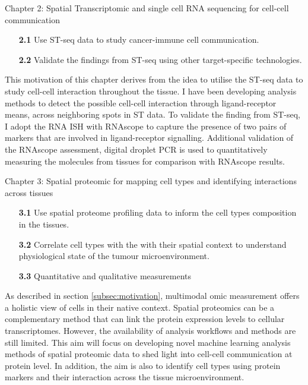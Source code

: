 Chapter 2: Spatial Transcriptomic and single cell RNA sequencing for cell-cell communication
\begin{enumerate}[align=left]
    \item[\textbf{2.1}] Use ST-seq data to study cancer-immune cell communication.
    \item[\textbf{2.2}] Validate the findings from ST-seq using other target-specific technologies.
\end{enumerate}
This motivation of this chapter derives from the idea to utilise the ST-seq data to study cell-cell interaction throughout the tissue. I have been developing analysis methods to detect the possible cell-cell interaction through ligand-receptor means, across neighboring spots in ST data. To validate the finding from ST-seq, I adopt the RNA ISH with RNAscope to capture the presence of two pairs of markers that are involved in ligand-receptor signalling. Additional validation of the RNAscope assessment, digital droplet PCR is used to quantitatively measuring the molecules from tissues for comparison with RNAscope results.      

Chapter 3: Spatial proteomic for mapping cell types and identifying interactions across tissues
\begin{enumerate}[align=left]
    \item[\textbf{3.1}] Use spatial proteome profiling data to inform the cell types composition in the tissues.
    \item[\textbf{3.2}] Correlate cell types with the with their spatial context to understand physiological state of the tumour microenvironment.
    \item[\textbf{3.3}] Quantitative and qualitative measurements
\end{enumerate}
As described in section \ref{subsec:motivation}, multimodal omic measurement offers a holistic view of cells in their native context. Spatial proteomics can be a complementary method that can link the protein expression levels to cellular transcriptomes. However, the availability of analysis workflows and methods are still limited. This aim will focus on developing novel machine learning analysis methods of spatial proteomic data to shed light into cell-cell communication at protein level. In addition, the aim is also to identify cell types using protein markers and their interaction across the tissue microenvironment.             

